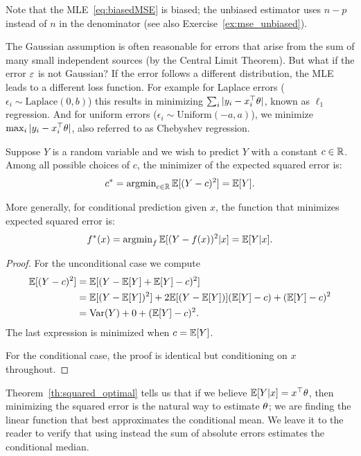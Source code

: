 Note that the MLE~\eqref{eq:biasedMSE} is biased; the unbiased estimator uses $n-p$ instead of $n$ in the denominator (see also Exercise~\ref{ex:mse_unbiased}).




\begin{remark}
The Gaussian assumption is often reasonable for errors 
that arise from the sum of many small independent sources (by the Central Limit Theorem).
But what if the error $\varepsilon$ is not Gaussian? If the error follows a different distribution, the MLE leads to a different loss function.
For example for Laplace errors ($\epsilon_i \sim \text{Laplace}(0, b)$) this results in minimizing $\sum_i |y_i - x_i^\top\theta|$, known as $\ell_1$ regression. And for uniform errors ($\epsilon_i \sim \text{Uniform}(-a, a)$), we minimize $\max_i |y_i - x_i^\top\theta|$, also referred to as Chebyshev regression.
\end{remark}



\begin{theorem}\label{th:squared_optimal}
Suppose $Y$ is a random variable and we wish to predict $Y$ with a constant $c \in \mathbb{R}$. 
Among all possible choices of $c$, the minimizer of the expected squared error is:
$$c^* = \operatorname{argmin}_{c \in \mathbb{R}} \mathbb{E}[(Y - c)^2] = \mathbb{E}[Y].$$

More generally, for conditional prediction given $x$, the function that minimizes 
expected squared error is:
$$f^*(x) = \operatorname{argmin}_{f} \mathbb{E}[(Y - f(x))^2 | x] = \mathbb{E}[Y | x].$$
\end{theorem}

\begin{proof}
For the unconditional case we compute
\begin{align*}
  \mathbb{E}[(Y - c)^2]
  &= \mathbb{E}[(Y - \mathbb{E}[Y] + \mathbb{E}[Y] - c)^2]\\
  &= \mathbb{E}[(Y - \mathbb{E}[Y])^2] + 2\mathbb{E}[(Y - \mathbb{E}[Y])](\mathbb{E}[Y] - c) + (\mathbb{E}[Y] - c)^2\\
  &= \operatorname{Var}(Y) + 0 + (\mathbb{E}[Y] - c)^2.
\end{align*}
The last expression is minimized when $c = \mathbb{E}[Y]$.

For the conditional case, the proof is identical but conditioning on $x$ throughout.

\end{proof}

Theorem~\ref{th:squared_optimal} tells us that if we believe $\mathbb{E}[Y | x] = x^\top\theta$, 
then minimizing the squared error is the natural way to estimate $\theta$; we are finding the 
linear function that best approximates the conditional mean. We leave it to the reader to verify that using instead the sum of absolute errors estimates the conditional median.
 




